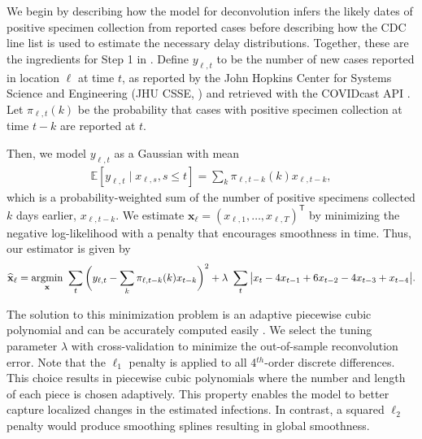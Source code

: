 \begin{linenomath*} 
We begin by describing how the model for deconvolution infers the likely
dates of positive specimen collection from reported cases before describing how
the CDC line list \citep{cdc2020caserestr} is used to estimate the necessary
delay distributions. Together, these are the ingredients for Step 1 in
. Define $y_{\ell,t}$ to be the number of
new cases reported in location $\ell$ at time $t$, as reported by the John
Hopkins Center for Systems Science and Engineering (JHU CSSE,
\citealp{dong2020interactive}) and retrieved with the COVIDcast API
\citep{reinhart2021open}. Let $\pi_{\ell,t}(k)$ be the probability that cases
with positive specimen collection at time $t-k$ are reported at $t$. 
\end{linenomath*} 
\begin{linenomath*} 
Then, we
model $y_{\ell,t}$ as a Gaussian with mean 
\begin{align}
  \mathbb{E}[y_{\ell,t} \mid x_{\ell,s}, s \leq t ] =\sum_{k} \pi_{\ell,t-k}(k)x_{\ell,t-k},
  \label{eq:cases-model}
\end{align}
which is a probability-weighted sum of the number of positive specimens
collected $k$ days earlier, $x_{\ell,t-k}$. We estimate $\mathbf{x}_\ell =
(x_{\ell,1},\ldots,x_{\ell,T})^{\mathsf{T}}$ by minimizing the negative
log-likelihood with a penalty that encourages smoothness in time. Thus, our
estimator is given by
\begin{align}
  \widehat{\mathbf{x}}_\ell = \operatorname*{argmin}_{\mathbf{x}}\ \sum_{t}
  \bigg( y_{\ell,t} -  \sum_k \pi_{\ell,t-k}(k) x_{t-k} \bigg)^2 
  + \lambda\ \sum_t \big|x_t - 4x_{t-1} + 6x_{t-2} -4x_{t-3}+ x_{t-4}\big|.
  \label{eq:cases-deconvolved}
\end{align}
\end{linenomath*} 
The solution to this minimization problem is an adaptive piecewise cubic
polynomial \citep{tibshirani2014adaptive, tibshirani2022divided} and can be
accurately computed easily \citep{ramdas2016fast,jahja2022real}. We select
the tuning parameter $\lambda$ with cross-validation to minimize the
out-of-sample reconvolution error. Note that the $\ell_1$ penalty is applied to
all 4$^{th}$-order discrete differences. This choice results in piecewise cubic
polynomials \citep[discrete splines,][]{tibshirani2022divided} where the number
and length of each piece is chosen adaptively. This property enables the model
to better capture localized changes in the estimated infections. In contrast, a
squared $\ell_2$ penalty would produce smoothing splines resulting in global
smoothness.


